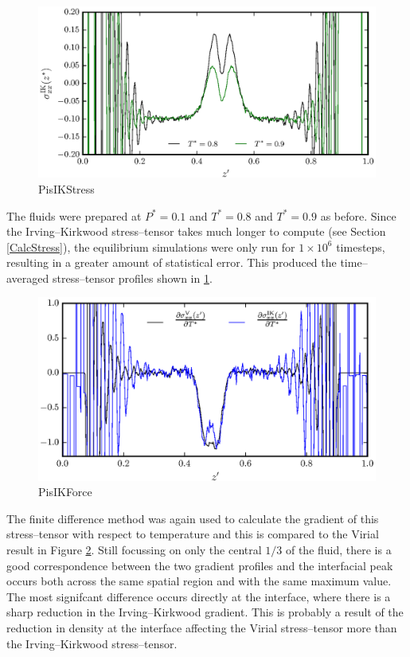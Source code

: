 \begin{figure}[h]
\centering
\includegraphics[scale=0.8]{PisIKStress}
\caption{PisIKStress}
\label{PisIKStress}
\end{figure}
The fluids were prepared at $P^{*}=0.1$ and $T^{*}=0.8$ and $T^{*}=0.9$ as before.
Since the Irving--Kirkwood stress--tensor takes much longer to compute (see Section \ref{CalcStress}), the equilibrium simulations were only run for $1 \times 10^{6}$ timesteps, resulting in a greater amount of statistical error.
This produced the time--averaged stress--tensor profiles shown in \ref{PisIKStress}.
\FloatBarrier

\begin{figure}[h]
\centering
\includegraphics[scale=0.8]{PisIKForce}
\caption{PisIKForce}
\label{PisIKForce}
\end{figure}
The finite difference method was again used to calculate the gradient of this stress--tensor with respect to temperature and this is compared to the Virial result in Figure \ref{PisIKForce}.
Still focussing on only the central $1/3$ of the fluid, there is a good correspondence between the two gradient profiles and the interfacial peak occurs both across the same spatial region and with the same maximum value.
The most signifcant difference occurs directly at the interface, where there is a sharp reduction in the Irving--Kirkwood gradient.
This is probably a result of the reduction in density at the interface affecting the Virial stress--tensor more than the Irving--Kirkwood stress--tensor.
\FloatBarrier

